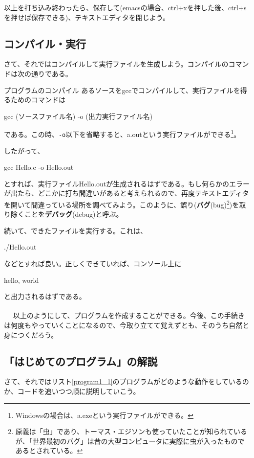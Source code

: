 以上を打ち込み終わったら、保存して(emacsの場合、ctrl+xを押した後、ctrl+sを押せば保存できる)、テキストエディタを閉じよう。

\subsection{コンパイル・実行}
さて、それではコンパイルして実行ファイルを生成しよう。コンパイルのコマンドは次の通りである。
\begin{itembox}[l]{プログラムのコンパイル}
あるソースをgccでコンパイルして、実行ファイルを得るためのコマンドは
\begin{code}
gcc (ソースファイル名) -o (出力実行ファイル名)
\end{code}
である。この時、\verb|-o|以下を省略すると、a.outという実行ファイルができる\footnote{Windowsの場合は、a.exeという実行ファイルができる。}。
\end{itembox}

したがって、
\begin{code}
gcc Hello.c -o Hello.out
\end{code}
とすれば、実行ファイルHello.outが生成されるはずである。もし何らかのエラーが出たら、どこかに打ち間違いがあると考えられるので、再度テキストエディタを開いて間違っている場所を調べてみよう。このように、誤り(\textbf{バグ}(bug)\footnote{原義は「虫」であり、トーマス・エジソンも使っていたことが知られているが、「世界最初のバグ」は昔の大型コンピュータに実際に虫が入ったものであるとされている。})を取り除くことを\textbf{デバッグ}(debug)と呼ぶ。

続いて、できたファイルを実行する。これは、
\begin{code}
./Hello.out
\end{code}
などとすれば良い。正しくできていれば、コンソール上に
\begin{code}
hello, world
\end{code}
と出力されるはずである。
\\ \\　
以上のようにして、プログラムを作成することができる。今後、この手続きは何度もやっていくことになるので、今取り立てて覚えずとも、そのうち自然と身につくだろう。

\subsection{「はじめてのプログラム」の解説}
さて、それではリスト\ref{program1_1}のプログラムがどのような動作をしているのか、コードを追いつつ順に説明していこう。

